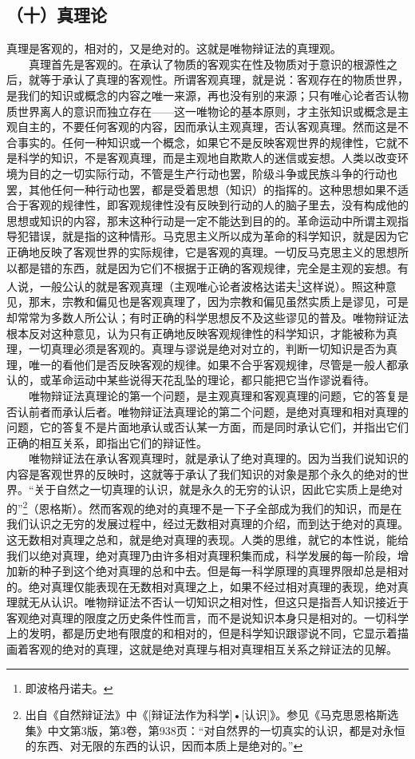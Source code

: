 \documentclass[cn,11pt,chinese]{elegantbook}
\def\myformat#1{\hfil\hfil #1}
\begin{document}
\subsection*{\myformat{（十）真理论}}
真理是客观的，相对的，又是绝对的。这就是唯物辩证法的真理观。\\
　　真理首先是客观的。在承认了物质的客观实在性及物质对于意识的根源性之后，就等于承认了真理的客观性。所谓客观真理，就是说：客观存在的物质世界，是我们的知识或概念的内容之唯一来源，再也没有别的来源；只有唯心论者否认物质世界离人的意识而独立存在——这一唯物论的基本原则，才主张知识或概念是主观自主的，不要任何客观的内容，因而承认主观真理，否认客观真理。然而这是不合事实的。任何一种知识或一个概念，如果它不是反映客观世界的规律性，它就不是科学的知识，不是客观真理，而是主观地自欺欺人的迷信或妄想。人类以改变环境为目的之一切实际行动，不管是生产行动也罢，阶级斗争或民族斗争的行动也罢，其他任何一种行动也罢，都是受着思想（知识）的指挥的。这种思想如果不适合于客观的规律性，即客观规律性没有反映到行动的人的脑子里去，没有构成他的思想或知识的内容，那末这种行动是一定不能达到目的的。革命运动中所谓主观指导犯错误，就是指的这种情形。马克思主义所以成为革命的科学知识，就是因为它正确地反映了客观世界的实际规律，它是客观的真理。一切反马克思主义的思想所以都是错的东西，就是因为它们不根据于正确的客观规律，完全是主观的妄想。有人说，一般公认的就是客观真理（主观唯心论者波格达诺夫\footnote[18]{ 即波格丹诺夫。}这样说）。照这种意见，那末，宗教和偏见也是客观真理了，因为宗教和偏见虽然实质上是谬见，可是却常常为多数人所公认；有时正确的科学思想反不及这些谬见的普及。唯物辩证法根本反对这种意见，认为只有正确地反映客观规律性的科学知识，才能被称为真理，一切真理必须是客观的。真理与谬说是绝对对立的，判断一切知识是否为真理，唯一的看他们是否反映客观的规律。如果不合乎客观规律，尽管是一般人都承认的，或革命运动中某些说得天花乱坠的理论，都只能把它当作谬说看待。\\
　　唯物辩证法真理论的第一个问题，是主观真理和客观真理的问题，它的答复是否认前者而承认后者。唯物辩证法真理论的第二个问题，是绝对真理和相对真理的问题，它的答复不是片面地承认或否认某一方面，而是同时承认它们，并指出它们正确的相互关系，即指出它们的辩证性。\\
　　唯物辩证法在承认客观真理时，就是承认了绝对真理的。因为当我们说知识的内容是客观世界的反映时，这就等于承认了我们知识的对象是那个永久的绝对的世界。“关于自然之一切真理的认识，就是永久的无穷的认识，因此它实质上是绝对的”\footnote[19]{ 出自《自然辩证法》中《[辩证法作为科学]•[认识]》。参见《马克思恩格斯选集》中文第3版，第3卷，第938页：“对自然界的一切真实的认识，都是对永恒的东西、对无限的东西的认识，因而本质上是绝对的。”}（恩格斯）。然而客观的绝对的真理不是一下子全部成为我们的知识，而是在我们认识之无穷的发展过程中，经过无数相对真理的介绍，而到达于绝对的真理。这无数相对真理之总和，就是绝对真理的表现。人类的思维，就它的本性说，能给我们以绝对真理，绝对真理乃由许多相对真理积集而成，科学发展的每一阶段，增加新的种子到这个绝对真理的总和中去。但是每一科学原理的真理界限却总是相对的。绝对真理仅能表现在无数相对真理之上，如果不经过相对真理的表现，绝对真理就无从认识。唯物辩证法不否认一切知识之相对性，但这只是指吾人知识接近于客观绝对真理的限度之历史条件性而言，而不是说知识本身只是相对的。一切科学上的发明，都是历史地有限度的和相对的，但是科学知识跟谬说不同，它显示着描画着客观的绝对的真理，这就是绝对真理与相对真理相互关系之辩证法的见解。\\
\end{document}
